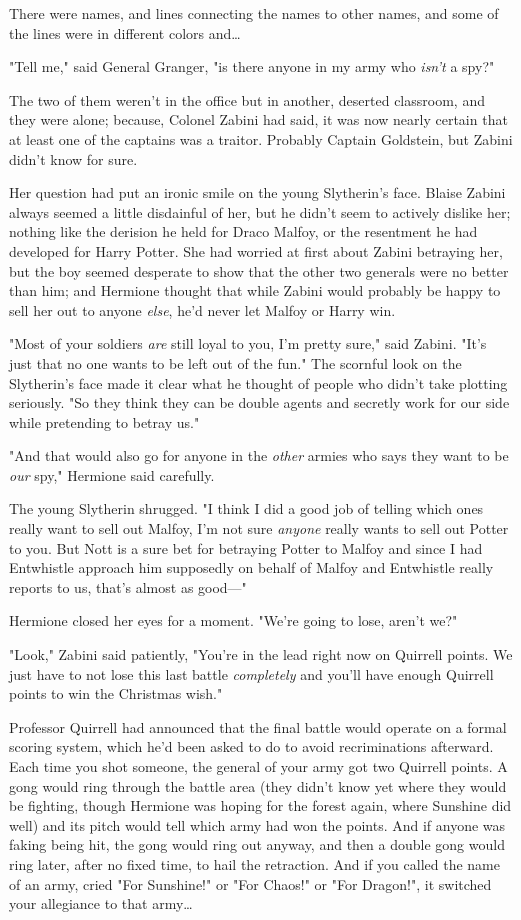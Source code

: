 There were names, and lines connecting the names to other names, and some of 
the lines were in different colors and{\ldots}

"Tell me," said General Granger, "is there anyone in my army who \emph{isn't} a 
spy?"

The two of them weren't in the office but in another, deserted classroom, and 
they were alone; because, Colonel Zabini had said, it was now nearly certain 
that at least one of the captains was a traitor. Probably Captain Goldstein, 
but Zabini didn't know for sure.

Her question had put an ironic smile on the young Slytherin's face. Blaise 
Zabini always seemed a little disdainful of her, but he didn't seem to actively 
dislike her; nothing like the derision he held for Draco Malfoy, or the 
resentment he had developed for Harry Potter. She had worried at first about 
Zabini betraying her, but the boy seemed desperate to show that the other two 
generals were no better than him; and Hermione thought that while Zabini would 
probably be happy to sell her out to anyone \emph{else}, he'd never let Malfoy 
or Harry win.

"Most of your soldiers \emph{are} still loyal to you, I'm pretty sure," said 
Zabini. "It's just that no one wants to be left out of the fun." The scornful 
look on the Slytherin's face made it clear what he thought of people who didn't 
take plotting seriously. "So they think they can be double agents and secretly 
work for our side while pretending to betray us."

"And that would also go for anyone in the \emph{other} armies who says they 
want to be \emph{our} spy," Hermione said carefully.

The young Slytherin shrugged. "I think I did a good job of telling which ones 
really want to sell out Malfoy, I'm not sure \emph{anyone} really wants to sell 
out Potter to you. But Nott is a sure bet for betraying Potter to Malfoy and 
since I had Entwhistle approach him supposedly on behalf of Malfoy and 
Entwhistle really reports to us, that's almost as good---"

Hermione closed her eyes for a moment. "We're going to lose, aren't we?"

"Look," Zabini said patiently, "You're in the lead right now on Quirrell 
points. We just have to not lose this last battle \emph{completely} and you'll 
have enough Quirrell points to win the Christmas wish."

Professor Quirrell had announced that the final battle would operate on a 
formal scoring system, which he'd been asked to do to avoid recriminations 
afterward. Each time you shot someone, the general of your army got two 
Quirrell points. A gong would ring through the battle area (they didn't know 
yet where they would be fighting, though Hermione was hoping for the forest 
again, where Sunshine did well) and its pitch would tell which army had won the 
points. And if anyone was faking being hit, the gong would ring out anyway, and 
then a double gong would ring later, after no fixed time, to hail the 
retraction. And if you called the name of an army, cried "For Sunshine!" or 
"For Chaos!" or "For Dragon!", it switched your allegiance to that army{\ldots}

